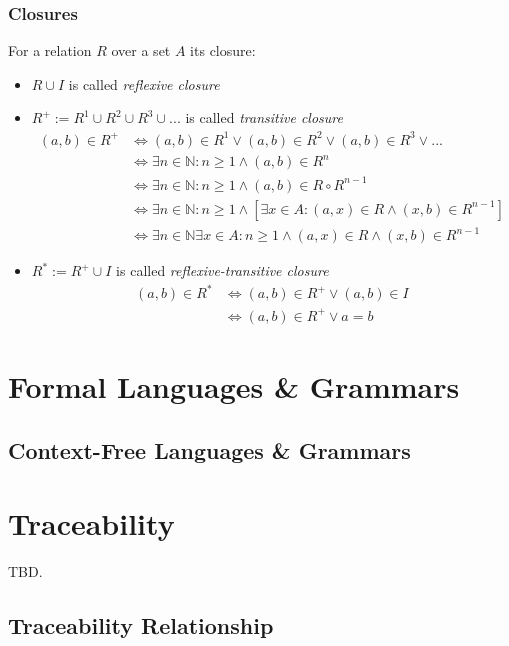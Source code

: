 \subsubsection{Closures}
For a relation $R$ over a set $A$ its closure:
\begin{itemize}
\item
$R \cup I$
is called \textit{reflexive closure}

\item
$R^{+} := R^{1} \cup R^{2} \cup R^{3} \cup ...$
is called \textit{transitive closure}
\begin{align}
(a,b) \in R^{+} 
&\Leftrightarrow 
(a,b) \in R^{1} \vee (a,b) \in R^{2} \vee (a,b) \in R^{3} \vee ...
\\&\Leftrightarrow 
\exists n \in \mathbb{N} : n \geq 1 \wedge (a,b) \in R^{n}
\\&\Leftrightarrow 
\exists n \in \mathbb{N} : n \geq 1 \wedge (a,b) \in R \circ R^{n-1}
\\&\Leftrightarrow 
\exists n \in \mathbb{N} : n \geq 1 \wedge [\exists x \in A : (a,x) \in R \wedge (x,b) \in R^{n-1} ]
\\&\Leftrightarrow 
\exists n \in \mathbb{N} \exists x \in A : n \geq 1 \wedge (a,x) \in R \wedge (x,b) \in R^{n-1}
\end{align}

\item
$R^{*} := R^{+} \cup I$
is called \textit{reflexive-transitive closure}
\begin{align}
(a,b) \in R^{*}
&\Leftrightarrow 
(a,b) \in R^{+} \vee (a,b) \in I
\\&\Leftrightarrow 
(a,b) \in R^{+} \vee a = b
\end{align}
\end{itemize}



\section{Formal Languages \& Grammars}
\subsection{Context-Free Languages \& Grammars}

\section{Traceability}
\cite{Winkler:2010:STR:1861285.1861287}
TBD.
\subsection{Traceability Relationship}

